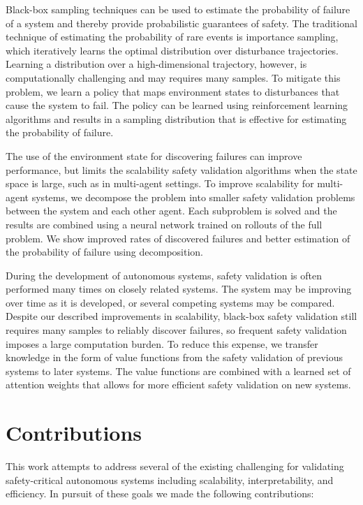 Black-box sampling techniques can be used to estimate the probability of failure of a system and thereby provide probabilistic guarantees of safety. The traditional technique of estimating the probability of rare events is importance sampling, which iteratively learns the optimal distribution over disturbance trajectories. Learning a distribution over a high-dimensional trajectory, however, is computationally challenging and may requires many samples. To mitigate this problem, we learn a policy that maps environment states to disturbances that cause the system to fail. The policy can be learned using reinforcement learning algorithms and results in a sampling distribution that is effective for estimating the probability of failure. 

The use of the environment state for discovering failures can improve performance, but limits the scalability safety validation algorithms when the state space is large, such as in multi-agent settings. To improve scalability for multi-agent systems, we decompose the problem into smaller safety validation problems between the system and each other agent. Each subproblem is solved and the results are combined using a neural network trained on rollouts of the full problem. We show improved rates of discovered failures and better estimation of the probability of failure using decomposition. 

During the development of autonomous systems, safety validation is often performed many times on closely related systems. The system may be improving over time as it is developed, or several competing systems may be compared. Despite our described improvements in scalability, black-box safety validation still requires many samples to reliably discover failures, so frequent safety validation imposes a large computation burden. To reduce this expense, we transfer knowledge in the form of value functions from the safety validation of previous systems to later systems. The value functions are combined with a learned set of attention weights that allows for more efficient safety validation on new systems. 

\section{Contributions}
This work attempts to address several of the existing challenging for validating safety-critical autonomous systems including scalability, interpretability, and efficiency. In pursuit of these goals we made the following contributions:

